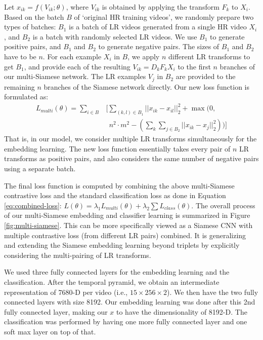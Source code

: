 \documentclass[letterpaper]{article} %
\begin{document}
Let $x_{ik} = f(V_{ik} ; \theta)$, where $V_{ik}$ is obtained by applying the transform $F_k$ to $X_i$. Based on the batch $B$ of `original HR training videos', we randomly prepare two types of batches: $B_1$ is a batch of LR videos generated from a single HR video $X_i$, and $B_2$ is a batch with randomly selected LR videos. We use $B_1$ to generate positive pairs, and $B_1$ and $B_2$ to generate negative pairs. The sizes of $B_1$ and $B_2$ have to be $n$. For each example $X_i$ in $B$, we apply $n$ different LR transforms to get $B_1$, and provide each of the resulting $V_{ik} = D_k F_k X_i$ to the first $n$ branches of our multi-Siamese network. The LR examples $V_j$ in $B_2$ are provided to the remaining $n$ branches of the Siamese network directly. Our new loss function is formulated as:
\begin{equation}
\begin{split}
L_{multi}(\theta) = \sum_{i \in B} &\Bigg[ \sum_{(k, l) \in B_1} ||x_{ik} - x_{il}||_2^2 + \max(0, \\
        &~~n^2 \cdot m^2 - ( \sum_{k}\sum_{j \in B_2} ||x_{ik} - x_j||_2^2 ))\Bigg]
\end{split}
\end{equation}
That is, in our model, we consider multiple LR transforms simultaneously for the embedding learning. The new loss function essentially takes every pair of $n$ LR transforms as positive pairs, and also considers the same number of negative pairs using a separate batch.

The final loss function is computed by combining the above multi-Siamese contrastive loss and the standard classification loss as done in Equation \ref{eq:combined-loss}: $L(\theta)= \lambda_1 L_{multi}(\theta) + \lambda_2 \sum L_{class}(\theta)$. The overall process of our multi-Siamese embedding and classifier learning is summarized in Figure \ref{fig:multi-siamese}. This can be more specifically viewed as a Siamese CNN with multiple contrastive loss (from different LR pairs) combined. It is generalizing and extending the Siamese embedding learning beyond triplets by explicitly considering the multi-pairing of LR transforms.

We used three fully connected layers for the embedding learning and the classification. After the temporal pyramid, we obtain an intermediate representation of 7680-D per video (i.e., $15 \times 256 \times 2$). We then have the two fully connected layers with size 8192. Our embedding learning was done after this 2nd fully connected layer, making our $x$ to have the dimensionality of 8192-D. The classification was performed by having one more fully connected layer and one soft max layer on top of that.
\end{document}
